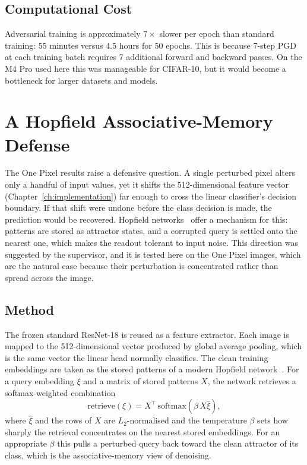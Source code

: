 \subsection{Computational Cost}

Adversarial training is approximately $7\times$ slower per epoch than standard training: 55 minutes versus 4.5 hours for 50 epochs. This is because 7-step PGD at each training batch requires 7 additional forward and backward passes. On the M4 Pro used here this was manageable for CIFAR-10, but it would become a bottleneck for larger datasets and models.

\section{A Hopfield Associative-Memory Defense}
\label{sec:hopfield}

The One Pixel results raise a defensive question. A single perturbed pixel alters only a handful of input values, yet it shifts the 512-dimensional feature vector (Chapter~\ref{ch:implementation}) far enough to cross the linear classifier's decision boundary. If that shift were undone before the class decision is made, the prediction would be recovered. Hopfield networks~\cite{hopfield1982neural} offer a mechanism for this: patterns are stored as attractor states, and a corrupted query is settled onto the nearest one, which makes the readout tolerant to input noise. This direction was suggested by the supervisor, and it is tested here on the One Pixel images, which are the natural case because their perturbation is concentrated rather than spread across the image.

\subsection{Method}

The frozen standard ResNet-18 is reused as a feature extractor. Each image is mapped to the 512-dimensional vector produced by global average pooling, which is the same vector the linear head normally classifies. The clean training embeddings are taken as the stored patterns of a modern Hopfield network~\cite{ramsauer2021hopfield}. For a query embedding $\xi$ and a matrix of stored patterns $X$, the network retrieves a softmax-weighted combination
\begin{equation}
\mathrm{retrieve}(\xi) = X^{\top}\,\mathrm{softmax}\!\left(\beta\, X \hat{\xi}\right),
\end{equation}
where $\hat{\xi}$ and the rows of $X$ are $L_2$-normalised and the temperature $\beta$ sets how sharply the retrieval concentrates on the nearest stored embeddings. For an appropriate $\beta$ this pulls a perturbed query back toward the clean attractor of its class, which is the associative-memory view of denoising.

